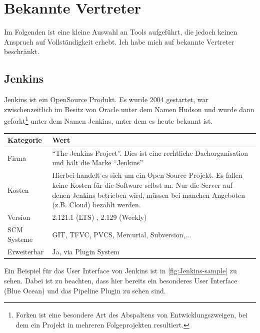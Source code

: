 \section{Bekannte Vertreter}
Im Folgenden ist eine kleine Auswahl an Tools aufgeführt, die jedoch keinen Anspruch auf Vollständigkeit erhebt. Ich habe mich auf bekannte Vertreter beschränkt.
\subsection{Jenkins}
Jenkins ist ein OpenSource Produkt. Es wurde 2004 gestartet, war zwischenzeitlich im Besitz von Oracle unter dem Namen Hudson und wurde dann geforkt\footnote{Forken ist eine besondere Art des Abspaltens von Entwicklungszweigen, bei dem ein Projekt in mehreren Folgeprojekten resultiert.} unter dem Namen Jenkins, unter dem es heute bekannt ist. 
\begin{center}
  \begin{tabularx}{\textwidth}{lX}
    \toprule
    Kategorie & Wert \\
    \midrule
    Firma & "`The Jenkins Project"'. Dies ist eine rechtliche Dachorganisation und hält die Marke "`Jenkins"' \\
		\addlinespace
    Kosten & Hierbei handelt es sich um ein Open Source Projekt. Es fallen keine Kosten für die Software selbst an. Nur die Server auf denen Jenkins betrieben wird, müssen bei manchen Angeboten (z.B. Cloud) bezahlt werden. \\
		\addlinespace
		Version & 2.121.1 (LTS) , 2.129 (Weekly) \\
		\addlinespace
		SCM Systeme & GIT, TFVC, PVCS, Mercurial, Subversion,...\\
		\addlinespace
		Erweiterbar & Ja, via Plugin System\\
    \bottomrule
  \end{tabularx}
\end{center}
Ein Beispiel für das User Interface von Jenkins ist in \autoref{fig:Jenkins-sample} zu sehen. Dabei ist zu beachten, dass hier bereits ein besonderes User Interface (Blue Ocean) und das Pipeline Plugin zu sehen sind. 
